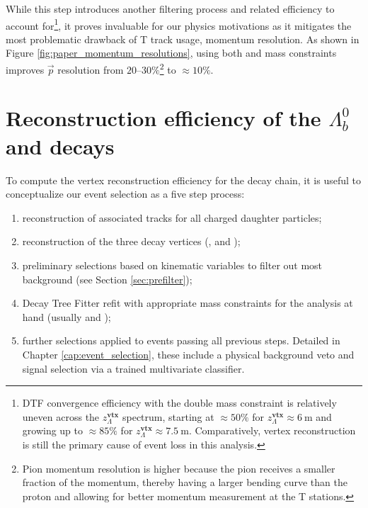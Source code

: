 While this step introduces another filtering process and related efficiency to account for\footnote{DTF convergence efficiency with the double mass constraint is relatively uneven across the $z_\Lambda^\textbf{vtx}$ spectrum, starting at $\approx 50\%$ for $z_\Lambda^\textbf{vtx} \approx \SI{6}{\meter}$ and growing up to $\approx 85\%$ for $z_\Lambda^\textbf{vtx} \approx \SI{7.5}{\meter}$.
Comparatively, vertex reconstruction is still the primary cause of event loss in this analysis.}, it proves invaluable for our physics motivations as it mitigates the most problematic drawback of T track usage, momentum resolution.
As shown in Figure \ref{fig:paper_momentum_resolutions}, using both \jpsi and \lz mass constraints improves $\vec{p}$ resolution from $20$--$30\%$\footnote{Pion momentum resolution is higher because the pion receives a smaller fraction of the \lz momentum, thereby having a larger bending curve than the proton and allowing for better momentum measurement at the T stations.} to $\approx 10\%$.


\section{Reconstruction efficiency of the \texorpdfstring{$\Lambda^0_b$}{Lambdab} and \texorpdfstring{\lz}{Lambda} decays}
\label{sec:reco_efficiency}

To compute the vertex reconstruction efficiency for the \lbz decay chain, it is useful to conceptualize our event selection as a five step process:
\begin{enumerate}
	\item reconstruction of associated tracks for all charged daughter particles;
	\item reconstruction of the three decay vertices (\lz, \jpsi and \lbz);
	\item preliminary selections based on kinematic variables to filter out most background (see Section \ref{sec:prefilter});
	\item Decay Tree Fitter refit with appropriate mass constraints for the analysis at hand (usually \jpsi and \lz);
	\item further selections applied to events passing all previous steps. Detailed in Chapter \ref{cap:event_selection}, these include a physical background veto and signal selection via a trained multivariate classifier.
\end{enumerate}

